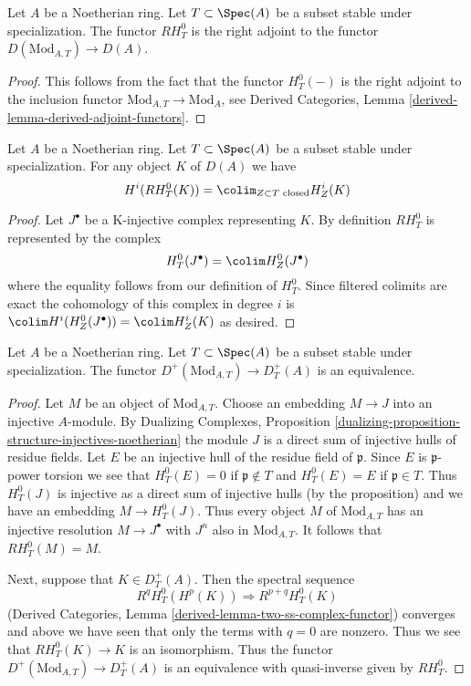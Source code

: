 \begin{lemma}
\label{lemma-adjoint}
Let $A$ be a Noetherian ring. Let $T \subset \Spec(A)$
be a subset stable under specialization. The functor
$RH^0_T$ is the right adjoint to the functor
$D(\text{Mod}_{A, T}) \to D(A)$.
\end{lemma}

\begin{proof}
This follows from the fact that the functor $H^0_T(-)$ is
the right adjoint to the inclusion functor
$\text{Mod}_{A, T} \to \text{Mod}_A$, see
Derived Categories, Lemma \ref{derived-lemma-derived-adjoint-functors}.
\end{proof}

\begin{lemma}
\label{lemma-adjoint-ext}
Let $A$ be a Noetherian ring. Let $T \subset \Spec(A)$
be a subset stable under specialization.
For any object $K$ of $D(A)$ we have
$$
H^i(RH^0_T(K)) = \colim_{Z \subset T\text{ closed}} H^i_Z(K)
$$
\end{lemma}

\begin{proof}
Let $J^\bullet$ be a K-injective complex representing $K$.
By definition $RH^0_T$ is represented by the complex
$$
H^0_T(J^\bullet) = \colim H^0_Z(J^\bullet)
$$
where the equality follows from our definition of $H^0_T$.
Since filtered colimits are exact the cohomology of this
complex in degree $i$ is
$\colim H^i(H^0_Z(J^\bullet)) = \colim H^i_Z(K)$
as desired.
\end{proof}

\begin{lemma}
\label{lemma-equal-plus}
Let $A$ be a Noetherian ring. Let $T \subset \Spec(A)$ be a subset stable
under specialization. The functor $D^+(\text{Mod}_{A, T}) \to D^+_T(A)$
is an equivalence.
\end{lemma}

\begin{proof}
Let $M$ be an object of $\text{Mod}_{A, T}$. Choose an embedding
$M \to J$ into an injective $A$-module. By
Dualizing Complexes, Proposition
\ref{dualizing-proposition-structure-injectives-noetherian}
the module $J$ is a direct sum of injective hulls of residue fields.
Let $E$ be an injective hull of the residue field of $\mathfrak p$.
Since $E$ is $\mathfrak p$-power torsion we see that
$H^0_T(E) = 0$ if $\mathfrak p \not \in T$ and
$H^0_T(E) = E$ if $\mathfrak p \in T$.
Thus $H^0_T(J)$ is injective as a direct sum of injective hulls
(by the proposition) and we have an embedding $M \to H^0_T(J)$.
Thus every object $M$ of $\text{Mod}_{A, T}$ has an injective resolution
$M \to J^\bullet$ with $J^n$ also in $\text{Mod}_{A, T}$. It follows
that $RH^0_T(M) = M$.

\medskip\noindent
Next, suppose that $K \in D_T^+(A)$. Then the spectral sequence
$$
R^qH^0_T(H^p(K)) \Rightarrow R^{p + q}H^0_T(K)
$$
(Derived Categories, Lemma \ref{derived-lemma-two-ss-complex-functor})
converges and above we have seen that only the terms with $q = 0$
are nonzero. Thus we see that $RH^0_T(K) \to K$ is an isomorphism.
Thus the functor $D^+(\text{Mod}_{A, T}) \to D^+_T(A)$
is an equivalence with quasi-inverse given by $RH^0_T$.
\end{proof}

